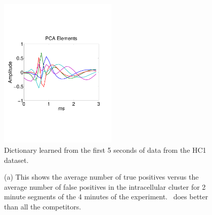 
\begin{center}
\begin{figure}[h!]
\includegraphics[width=0.5\textwidth]{../figs/new/pcaelements.pdf}
\caption{Dictionary learned from the first 5 seconds of data from the HC1 dataset. 
} \label{fig:dict}
\end{figure}
\end{center}

\begin{figure}[htbp]
	\centering
	\caption{(a) This shows the average number of true positives versus the average number of false positives in the intracellular cluster for 2 minute segments of the 4 minutes of the experiment.  \smug\ does better than all the competitors.  }
	\label{fig:asdf}
\end{figure}





